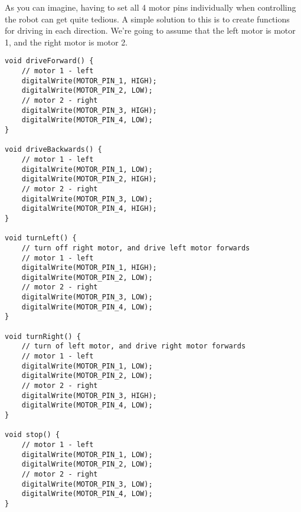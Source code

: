 \documentclass[../TinyBot.tex]{subfiles}
\begin{document}
As you can imagine, having to set all 4 motor pins individually when controlling the robot
can get quite tedious. A simple solution to this is to create functions for driving in
each direction. We're going to assume that the left motor is motor 1, and the right motor is
motor 2. \\

\begin{lstlisting}
void driveForward() {
    // motor 1 - left
    digitalWrite(MOTOR_PIN_1, HIGH);
    digitalWrite(MOTOR_PIN_2, LOW);
    // motor 2 - right
    digitalWrite(MOTOR_PIN_3, HIGH);
    digitalWrite(MOTOR_PIN_4, LOW);
}

void driveBackwards() {
    // motor 1 - left
    digitalWrite(MOTOR_PIN_1, LOW);
    digitalWrite(MOTOR_PIN_2, HIGH);
    // motor 2 - right
    digitalWrite(MOTOR_PIN_3, LOW);
    digitalWrite(MOTOR_PIN_4, HIGH);
}

void turnLeft() {
    // turn off right motor, and drive left motor forwards
    // motor 1 - left
    digitalWrite(MOTOR_PIN_1, HIGH);
    digitalWrite(MOTOR_PIN_2, LOW);
    // motor 2 - right
    digitalWrite(MOTOR_PIN_3, LOW);
    digitalWrite(MOTOR_PIN_4, LOW);
}

void turnRight() {
    // turn of left motor, and drive right motor forwards
    // motor 1 - left
    digitalWrite(MOTOR_PIN_1, LOW);
    digitalWrite(MOTOR_PIN_2, LOW);
    // motor 2 - right
    digitalWrite(MOTOR_PIN_3, HIGH);
    digitalWrite(MOTOR_PIN_4, LOW);
}

void stop() {
    // motor 1 - left
    digitalWrite(MOTOR_PIN_1, LOW);
    digitalWrite(MOTOR_PIN_2, LOW);
    // motor 2 - right
    digitalWrite(MOTOR_PIN_3, LOW);
    digitalWrite(MOTOR_PIN_4, LOW);
}
\end{lstlisting}
\end{document}
